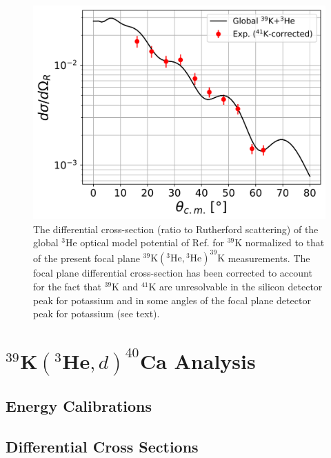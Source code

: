 \begin{figure}[t]
\centering
\includegraphics[width=6in]{Chapter-6/figs/ES_41K_Correction.png}
\caption{\label{fig:ES_41K_Correction}The differential cross-section (ratio to Rutherford scattering) of the global $^{3}$He optical model potential of Ref. \cite{Liang2009} for $^{39}$K normalized to that of the present focal plane $^{39}\mathrm{K}(^{3}\mathrm{He}, {}^{3}\mathrm{He})^{39}\mathrm{K}$ measurements. The focal plane differential cross-section has been corrected to account for the fact that $^{39}$K and $^{41}$K are unresolvable in the silicon detector peak for potassium and in some angles of the focal plane detector peak for potassium (see text).}
\end{figure}

\section{$^{39}\mathrm{\textbf{K}}(^{3}\mathrm{\textbf{He}},d)^{40}\mathrm{\textbf{Ca}}$ Analysis}

\subsection{Energy Calibrations} \label{subsec:cal}



\subsection{Differential Cross Sections}

